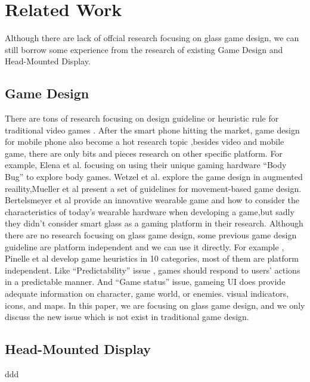 \section{Related Work}

Although there are lack of offcial research focusing on glass game design, we can still borrow some experience from the research of existing Game Design and Head-Mounted Display.

\subsection{Game Design}

There are tons of research focusing on design guideline or heuristic rule for traditional video games \cite{gameflow,criticalreview,chi04game,09game,02game,08game,07game}. After the smart phone hitting the market, game design for mobile phone also become a hot research topic \cite{mobilegame,mobile06,mobile08,icec06},besides video and mobile game, there are only bits and pieces research on other specific platform. For example, Elena et al. focusing on using their unique gaming hardware ``Body Bug'' to explore body games\cite{bodygame}. Wetzel et al. explore the game design in augmented reaility\cite{argame},Mueller et al present a set of guidelines for movement-based game design\cite{movegame}. Bertelsmeyer et al provide an innovative wearable game and how to consider the characteristics of today's wearable hardware when developing a game\cite{wearable},but sadly they didn't consider smart glass as a gaming platform in their research. 
Although there are no research focusing on glass game design, some previous game design guideline are platform independent and we can use it directly. For example , Pinelle et al \cite{videogame} develop game heuristics in 10 categories, most of them are platform independent. Like ``Predictability'' issue , games should respond to users’ actions in a predictable manner. And ``Game status'' issue, gameing UI does provide adequate information on character, game world, or enemies. visual indicators, icons, and maps. In this paper, we are focusing on glass game design, and we only discuss the new issue which is not exist in traditional game design.


\subsection{Head-Mounted Display}
ddd